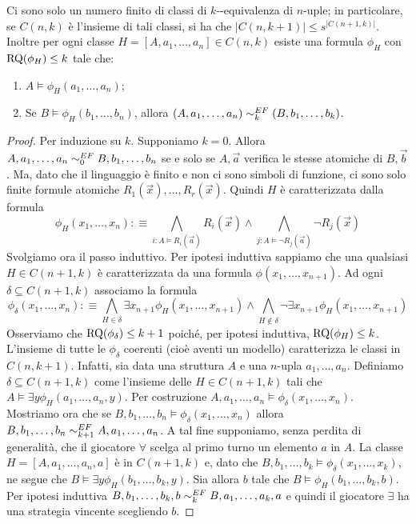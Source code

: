 \begin{lemma}
 Ci sono solo un numero finito di classi di $k$-\EF{}-equivalenza di $n$-uple;
 in particolare, se $C(n,k)$
 è l'insieme di tali classi, si ha che $|C(n,k+1)| \leq s^{|C(n+1,k)|}$. Inoltre per ogni
 classe $H=[A,a_1,\ldots,a_n] \in C(n,k)$ esiste una formula $\phi_H$
 con $\operatorname{RQ}(\phi_H) \leq k$ tale che:
 \begin{enumerate}
  \item $A \models \phi_H(a_1, \ldots, a_n)$;
  \item Se $B \models \phi_H(b_1,\ldots,b_n)$, allora $(A,a_1,\ldots, a_n) \sim^{EF}_k (B,b_1,\ldots,b_k)$.
 \end{enumerate}
 \label{lemma:finite-formulas}
\end{lemma}
\begin{proof}
 Per induzione su $k$. Supponiamo $k=0$. Allora $A,a_1,\ldots,a_n \sim^{EF}_0 B,b_1,\ldots,b_n$
 se e solo se $A,\vec{a}$ verifica le stesse atomiche di $B,\vec{b}$. Ma,
 dato che il linguaggio è finito e non ci sono simboli di funzione,
 ci sono solo finite formule atomiche $R_1(\vec{x}),\ldots, R_r(\vec{x})$.
 Quindi $H$ è caratterizzata dalla formula
 \[\phi_H(x_1,\ldots,x_n) :\equiv \bigwedge_{i : A \models R_i(\vec{a})} R_i(\vec{x}) \land
   \bigwedge_{j : A \models \neg R_j(\vec{a})} \neg R_j(\vec{x})
 \]
 Svolgiamo ora il passo induttivo. Per ipotesi induttiva sappiamo che una qualsiasi
 $H \in C(n+1,k)$ è caratterizzata da una formula $\phi(x_1,\ldots,x_{n+1})$.
 Ad ogni $\delta \subseteq C(n+1,k)$ associamo la formula
 \[\phi_\delta(x_1,\ldots,x_n) :\equiv
 \bigwedge_{H \in \delta} \exists x_{n+1} \phi_H(x_1,\ldots,x_{n+1}) \land
  \bigwedge_{H \not\in \delta} \neg\exists x_{n+1} \phi_H(x_1,\ldots,x_{n+1})
 \]
 Osserviamo che $\operatorname{RQ}(\phi_\delta) \leq k+1$ poiché, per ipotesi induttiva,
 $\operatorname{RQ}(\phi_H) \leq k$. L'insieme di tutte le $\phi_\delta$ coerenti
 (cioè aventi un modello) caratterizza le classi in $C(n,k+1)$.
 Infatti, sia data una struttura $A$ e una $n$-upla $a_1,\ldots,a_n$. Definiamo
 $\delta \subseteq C(n+1,k)$ come l'insieme delle $H \in C(n+1,k)$
 tali che $A \models \exists y \phi_H(a_1,\ldots,a_n,y)$.
 Per costruzione $A,a_1,\ldots,a_n \models \phi_\delta(x_1,\ldots,x_n)$. Mostriamo
 ora che se $B,b_1,\ldots,b_n \models \phi_\delta(x_1,\ldots,x_n)$ allora
 $B,b_1,\ldots,b_n \sim^{EF}_{k+1} A,a_1,\ldots,a_n$. A tal fine supponiamo,
 senza perdita di generalità, che il giocatore $\forall$ scelga al primo turno
 un elemento $a$ in $A$. La classe $H=[A,a_1,\ldots,a_n,a]$ è in $C(n+1, k)$
 e, dato che $B,b_1,\ldots,b_k \models \phi_\delta(x_1,\ldots,x_k)$, ne segue che
 $B \models \exists y \phi_H(b_1,\ldots,b_k,y)$. Sia allora $b$ tale che
 $B \models \phi_H(b_1,\ldots,b_k,b)$. Per ipotesi induttiva
 $B,b_1,\ldots,b_k,b \sim^{EF}_k B,a_1,\ldots,a_k,a$ e quindi il giocatore
 $\exists$ ha una strategia vincente scegliendo $b$.

\end{proof}

